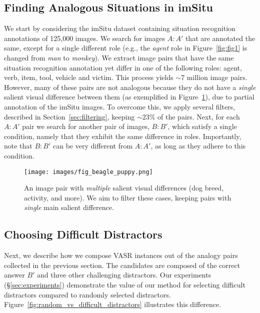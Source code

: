 \documentclass[letterpaper]{article} \usepackage{aaai23}  \usepackage{times}  \usepackage{helvet}  \usepackage{courier}  \usepackage[hyphens]{url}  \usepackage{graphicx} \urlstyle{rm} \def\UrlFont{\rm}  \usepackage{natbib}  \usepackage{caption} \frenchspacing  \setlength{\pdfpagewidth}{8.5in}  \setlength{\pdfpageheight}{11in}  \usepackage{algorithm}
\begin{document}
\subsection{Finding Analogous Situations in imSitu}
\label{sec:finding_analogies}

We start by considering the imSitu dataset containing situation recognition annotations of 125,000 images. We search for images $A:A'$ that are annotated the same, except for a single different role (e.g., the \emph{agent} role in Figure~\ref{fig:fig1} is changed from \emph{man} to \emph{monkey}). We extract image pairs that
have the same situation recognition annotation yet differ in one of the following roles: agent, verb, item, tool, vehicle and victim. This process yields $\sim$7 million image pairs. However, many of these pairs are not analogous because they do not have a \emph{single} salient visual difference between them (as exemplified in Figure~\ref{fig:fig_beagle_puppy}), due to partial annotation of the imSitu images. To overcome this, we apply several filters, described in Section~\ref{sec:filtering}, keeping $\sim$23\% of the pairs. Next, for each $A:A'$ pair we search for another pair of images, $B:B'$, which satisfy a single condition, namely that they exhibit the same difference in roles. Importantly, note that $B:B'$ can be very different from $A:A'$, as long as they adhere to this condition. 

\begin{figure}[!tb]
\centering
    \texttt{[image: images/fig\_beagle\_puppy.png]}\\
    \caption{An image pair with \emph{multiple} salient visual differences (dog breed, activity, and more). We aim to filter these cases, keeping pairs with \emph{single} main salient difference.}
    \label{fig:fig_beagle_puppy}
\end{figure}

\subsection{Choosing Difficult Distractors}
\label{sec:distractors}
Next, we describe how we compose VASR instances out of the analogy pairs collected in the previous section. The candidates are composed of the correct answer $B'$ and three other challenging distractors. Our experiments (\S\ref{sec:experiments}) demonstrate the value of our method for selecting difficult distractors compared to randomly selected distractors. Figure~\ref{fig:random_vs_difficult_distractors} illustrates this difference.
\end{document}

